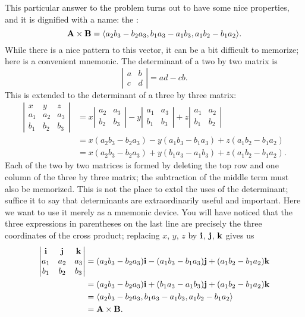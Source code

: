 This particular answer to the problem turns out to have some nice
properties, and it is dignified with a name: the 
:
$$
  {\bf A}\times{\bf B} = \langle
  a_2b_3-b_2a_3,b_1a_3-a_1b_3,a_1b_2-b_1a_2\rangle.
$$
While there is a nice pattern to this vector, it can be a bit
difficult to memorize;  here is a convenient mnemonic.
The determinant of a two by two matrix is
\[\left|
\begin{matrix}
a & b	\\
c & d
\end{matrix}
\right|=ad-cb.\]
This is extended to the determinant of a three by three matrix:
\begin{align*}
  \left|
  \begin{matrix}
  x	&	y	&	z	\\
  a_1	&	a_2	&	a_3	\\
  b_1	&	b_2	&	b_3
  \end{matrix}\right|
  &=x\left|
  \begin{matrix}
  a_2	&	a_3	\\
  b_2	&	b_3
  \end{matrix}
  \right|
  -y\left|
  \begin{matrix}
  a_1	&	a_3	\\
  b_1	&	b_3
  \end{matrix}
  \right|
  +z\left|
  \begin{matrix}
  a_1	&	a_2	\\
  b_1	&	b_2
  \end{matrix}
  \right|	\\
  &=x(a_2b_3-b_2a_3)-y(a_1b_3-b_1a_3)+z(a_1b_2-b_1a_2)	\\
  &=x(a_2b_3-b_2a_3)+y(b_1a_3-a_1b_3)+z(a_1b_2-b_1a_2).
\end{align*}
Each of the two by two matrices is formed by deleting the top row and
one column of the three by three matrix; the subtraction of the middle
term must also be memorized. This is not the place to extol the uses
of the determinant; suffice it to say that determinants are
extraordinarily useful and important. Here we want to use it merely as
a mnemonic device. You will have noticed that the three expressions in
parentheses on the last line are precisely the three coordinates of
the cross product; replacing $x$, $y$, $z$ by $\bf i$, $\bf j$, $\bf
k$ gives us
\begin{align*}
  \left|
  \begin{matrix}
  {\bf i}	&	{\bf j}	&	{\bf k}	\\
  a_1	&	a_2	&	a_3	\\
  b_1	&	b_2	&	b_3
  \end{matrix}
  \right|
  &=(a_2b_3-b_2a_3){\bf i}-(a_1b_3-b_1a_3){\bf j}+(a_1b_2-b_1a_2){\bf k}	\\
  &=(a_2b_3-b_2a_3){\bf i}+(b_1a_3-a_1b_3){\bf j}+(a_1b_2-b_1a_2){\bf k}	\\
  &=\langle a_2b_3-b_2a_3,b_1a_3-a_1b_3,a_1b_2-b_1a_2\rangle	\\
  &={\bf A}\times{\bf B}.
\end{align*}

